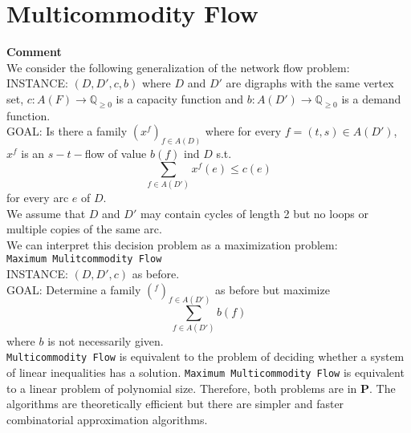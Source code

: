 \documentclass[a4paper, 12pt]{article}
\begin{document}
	\section{Multicommodity Flow}
	\textbf{Comment}\\
	We consider the following generalization of the network flow problem:\\
	INSTANCE: $(D,D',c,b)$ where $D$ and $D'$ are digraphs with the same vertex set, $c:A(F) \to \mathbb{Q}_{\geq 0}$ is a capacity function and $b: A(D') \to \mathbb{Q}_{\geq 0}$ is a demand function.\\
	GOAL: Is there a family $(x^f)_{f \in A(D)}$ where for every $f = (t,s) \in A(D')$, $x^f$ is an $s-t-$flow of value $b(f)$ ind $D$ s.t. \[\sum_{f \in A(D')}x^f(e) \leq c(e)\] for every arc $e$ of $D$.\\
	We assume that $D$ and $D'$ may contain cycles of length 2 but no loops or multiple copies of the same arc.\\
	We can interpret this decision problem as a maximization problem:\\
	\texttt{Maximum Mulitcommodity Flow}\\
	INSTANCE: $(D,D',c)$ as before.\\
	GOAL: Determine a family $(^f)_{f \in A(D')}$ as before but maximize \[\sum_{f \in A(D')}b(f)\] where $b$ is not necessarily given.\\
	\texttt{Multicommodity Flow} is equivalent to the problem of deciding whether a system of linear inequalities has a solution. \texttt{Maximum Multicommodity Flow} is equivalent to a linear problem of polynomial size. Therefore, both problems are in \textbf{P}. The algorithms are theoretically efficient but there are simpler and faster combinatorial approximation algorithms.\\
	
\end{document}
